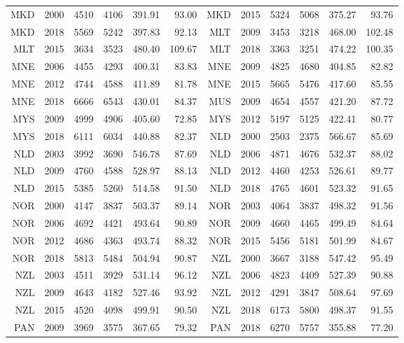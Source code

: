 {\begin{longtable}{r|r|r|r|r|r||r|r|r|r|r|r}
    MKD   & 2000  & 4510  & 4106  & 391.91 & 93.00 & MKD   & 2015  & 5324  & 5068  & 375.27 & 93.76 \\
    MKD   & 2018  & 5569  & 5242  & 397.83 & 92.13 & MLT   & 2009  & 3453  & 3218  & 468.00 & 102.48 \\
    MLT   & 2015  & 3634  & 3523  & 480.40 & 109.67 & MLT   & 2018  & 3363  & 3251  & 474.22 & 100.35 \\
    MNE   & 2006  & 4455  & 4293  & 400.31 & 83.83 & MNE   & 2009  & 4825  & 4680  & 404.85 & 82.82 \\
    MNE   & 2012  & 4744  & 4588  & 411.89 & 81.78 & MNE   & 2015  & 5665  & 5476  & 417.60 & 85.55 \\
    MNE   & 2018  & 6666  & 6543  & 430.01 & 84.37 & MUS   & 2009  & 4654  & 4557  & 421.20 & 87.72 \\
    MYS   & 2009  & 4999  & 4906  & 405.60 & 72.85 & MYS   & 2012  & 5197  & 5125  & 422.41 & 80.77 \\
    MYS   & 2018  & 6111  & 6034  & 440.88 & 82.37 & NLD   & 2000  & 2503  & 2375  & 566.67 & 85.69 \\
    NLD   & 2003  & 3992  & 3690  & 546.78 & 87.69 & NLD   & 2006  & 4871  & 4676  & 532.37 & 88.02 \\
    NLD   & 2009  & 4760  & 4588  & 528.97 & 88.13 & NLD   & 2012  & 4460  & 4253  & 526.61 & 89.77 \\
    NLD   & 2015  & 5385  & 5260  & 514.58 & 91.50 & NLD   & 2018  & 4765  & 4601  & 523.32 & 91.65 \\
    NOR   & 2000  & 4147  & 3837  & 503.37 & 89.14 & NOR   & 2003  & 4064  & 3837  & 498.32 & 91.56 \\
    NOR   & 2006  & 4692  & 4421  & 493.64 & 90.89 & NOR   & 2009  & 4660  & 4465  & 499.49 & 84.64 \\
    NOR   & 2012  & 4686  & 4363  & 493.74 & 88.32 & NOR   & 2015  & 5456  & 5181  & 501.99 & 84.67 \\
    NOR   & 2018  & 5813  & 5484  & 504.94 & 90.87 & NZL   & 2000  & 3667  & 3188  & 547.42 & 95.49 \\
    NZL   & 2003  & 4511  & 3929  & 531.14 & 96.12 & NZL   & 2006  & 4823  & 4409  & 527.39 & 90.88 \\
    NZL   & 2009  & 4643  & 4182  & 527.46 & 93.92 & NZL   & 2012  & 4291  & 3847  & 508.64 & 97.69 \\
    NZL   & 2015  & 4520  & 4098  & 499.91 & 90.50 & NZL   & 2018  & 6173  & 5800  & 498.37 & 91.55 \\
    PAN   & 2009  & 3969  & 3575  & 367.65 & 79.32 & PAN   & 2018  & 6270  & 5757  & 355.88 & 77.20 \\

\end{longtable}}
